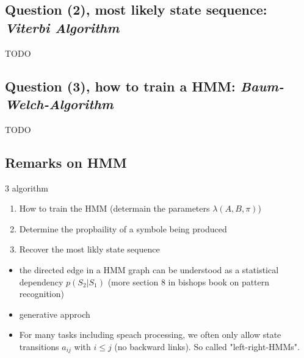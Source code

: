 \subsection{Question (2), most likely state sequence: \emph{Viterbi Algorithm}}

TODO

\subsection{Question (3), how to train a HMM: \emph{Baum-Welch-Algorithm}}

TODO

\subsection*{Remarks on HMM}

3 algorithm
\begin{enumerate}
    \item  How to train the HMM (determain the parameters $\lambda (A, B, \pi)$)
    \item  Determine the propbaility of a symbole being produced
    \item  Recover the most likly state sequence
\end{enumerate}

\begin{itemize}
    \item the directed edge in a HMM graph can be understood as a statistical dependency $p(S_2|S_1)$ (more section 8 in bishops book on pattern recognition)
    \item generative approch
    \item For many tasks including speach processing, we often only allow state transitions $a_{ij}$ with $i \le j$ (no backward links). So called "left-right-HMMs".
\end{itemize}
